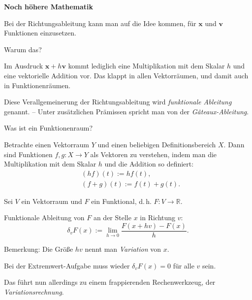 \documentclass[9pt]{beamer}
\newcommand{\R}{\mathbb R}
\newcommand{\strong}[1]{\textsf{\textbf{#1}}}
\begin{document}
\begin{frame}
\begin{center}
\strong{Noch höhere Mathematik}
\end{center}
\end{frame}

\begin{frame}
Bei der Richtungsableitung kann man auf die Idee kommen, für
$\mathbf x$ und $\mathbf v$ Funktionen einzusetzen.
\pause

\vspace{0.6em}
Warum das?
\pause

\vspace{0.6em}
Im Ausdruck $\mathbf x+h\mathbf v$ kommt lediglich eine
Multiplikation mit dem Skalar $h$ und eine vektorielle Addition vor.
Das klappt in allen Vektorräumen, und damit auch in Funktionenräumen.
\pause

\vspace{0.8em}
Diese Verallgemeinerung der Richtungsableitung wird
\emph{funktionale Ableitung} genannt. -- Unter zusätzlichen
Prämissen spricht man von der \emph{Gâteaux-Ableitung}.
\end{frame}

\begin{frame}
Was ist ein Funktionenraum?\pause

\vspace{0.8em}
Betrachte einen Vektorraum $Y$
und einen beliebigen Definitionsbereich $X$. Dann sind
Funktionen $f,g\colon X\to Y$ als Vektoren zu verstehen, indem
man die Multiplikation mit dem Skalar $h$ und
die Addition so definiert:
\begin{align*}
& (hf)(t) := hf(t),\\
& (f+g)(t) := f(t)+g(t).
\end{align*}
\end{frame}

\begin{frame}
\begin{Definition}
Sei $V$ ein Vektorraum und $F$ ein Funktional, d.\,h. $F\colon V\to\R$.

\vspace{0.6em}
Funktionale Ableitung von $F$ an der Stelle $x$ in Richtung $v$:
\[\delta_v F(x) := \lim_{h\to 0}\frac{F(x+hv)-F(x)}{h}.\]
\end{Definition}\pause

Bemerkung: Die Größe $hv$ nennt man \emph{Variation} von $x$.
\end{frame}

\begin{frame}
Bei der Extremwert-Aufgabe muss wieder $\delta_v F(x)=0$ für alle
$v$ sein.
\pause

\vspace{0.8em}
Das führt nun allerdings zu einem frappierenden Rechenwerkzeug,
der \emph{Variationsrechnung}.
\end{frame}
\end{document}
